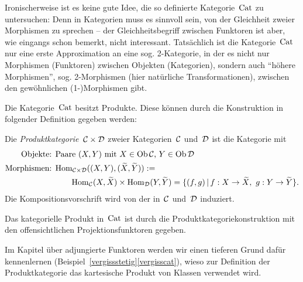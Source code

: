 \begin{bem}Ironischerweise ist es keine gute Idee, die so definierte
Kategorie~$\mathrm{Cat}$ zu untersuchen: Denn in Kategorien muss es sinnvoll sein, von
der Gleichheit zweier Morphismen zu sprechen -- der Gleichheitsbegriff zwischen
Funktoren ist aber, wie eingangs schon bemerkt, nicht interessant. Tatsächlich ist
die Kategorie~$\mathrm{Cat}$ nur eine erste Approximation an eine sog. 2-Kategorie, in
der es nicht nur Morphismen (Funktoren) zwischen Objekten (Kategorien), sondern
auch "`höhere Morphismen"', sog. 2-Morphismen (hier natürliche
Transformationen), zwischen den gewöhnlichen (1-)Morphismen gibt.
\end{bem}

Die Kategorie~$\mathrm{Cat}$ besitzt Produkte. Diese können durch die Konstruktion in
folgender Definition gegeben werden:
\begin{defn}\label{productcat}
Die \emph{Produktkategorie~$\mathcal{C} \times \mathcal{D}$} zweier Kategorien~$\mathcal{C}$ und~$\mathcal{D}$ ist
die Kategorie mit
\begin{align*}
  \text{Objekte: } & \text{Paare $(X,Y)$ mit~$X \in \operatorname{Ob}\mathcal{C}$, $Y \in \operatorname{Ob}\mathcal{D}$} \\
  \text{Morphismen: } &
    \mathrm{Hom}_{\mathcal{C} \times \mathcal{D}}((X,Y), (\widetilde X, \widetilde Y)) := \\
  & \qquad
      \mathrm{Hom}_{\mathcal{C}}(X,\widetilde X) \times \mathrm{Hom}_{\mathcal{D}}(Y,\widetilde Y) =
      \{ (f, g) \,|\, f : X \to \widetilde X,\ g : Y \to \widetilde Y \}.
\end{align*}
Die Kompositionsvorschrift wird von der in~$\mathcal{C}$ und~$\mathcal{D}$ induziert.
\end{defn}
\begin{prop}Das kategorielle Produkt in~$\mathrm{Cat}$ ist durch die
Produktkategoriekonstruktion mit den offensichtlichen Projektionsfunktoren
gegeben.\end{prop}
Im Kapitel über adjungierte Funktoren werden wir einen tieferen Grund dafür
kennenlernen (Beispiel~\ref{vergissstetig}\ref{vergisscat}), wieso zur
Definition der Produktkategorie das kartesische Produkt von Klassen verwendet
wird.


